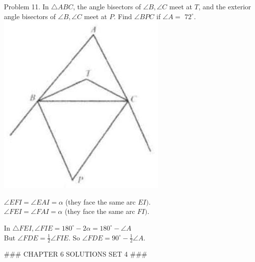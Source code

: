 \documentclass[10pt]{article}
\begin{document}
Problem 11. In \(\triangle A B C\), the angle bisectors of \(\angle B, \angle C\) meet at \(T\), and the exterior angle bisectors of \(\angle B, \angle C\) meet at \(P\). Find \(\angle B P C\) if \(\angle A=\) \(72^{\circ}\).\\
\includegraphics[max width=\textwidth, center]{2025_04_17_97bc1f7e44d93c271a88g-208(1)}


\(\angle E F I=\angle E A I=\alpha\) (they face the same arc \(E I)\).\\
\(\angle F E I=\angle F A I=\alpha\) (they face the same arc \(F I)\).

In \(\triangle F E I, \angle F I E=180^{\circ}-2 \alpha=180^{\circ}-\angle A\)\\
But \(\angle F D E=\frac{1}{2} \angle F I E\). So \(\angle F D E=90^{\circ}-\frac{1}{2} \angle A\).

### CHAPTER 6 SOLUTIONS SET 4 ###
\end{document}
